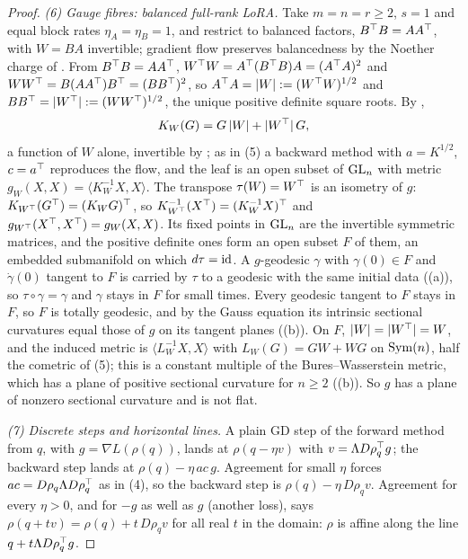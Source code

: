 \begin{proof}
\emph{(6) Gauge fibres: balanced full-rank LoRA.} Take $m=n=r\ge2$, $s=1$ and equal block rates $\eta_A=\eta_B=1$, and
restrict to balanced factors, $B^{\top} B=AA^{\top}$, with $W=BA$ invertible; gradient flow preserves balancedness by the Noether
charge of . From $B^{\top} B=AA^{\top}$, $W^{\top} W=A^{\top}(B^{\top} B)A=(A^{\top} A)^2$ and $WW^{\top}=B(AA^{\top})B^{\top}=(BB^{\top})^2$, so
$A^{\top} A=\lvert W\rvert:=(W^{\top} W)^{1/2}$ and $BB^{\top}=\lvert W^{\top}\rvert:=(WW^{\top})^{1/2}$, the unique positive definite square roots.
By ,
\[K_W(G)=G\,\lvert W\rvert+\lvert W^{\top}\rvert\,G ,\]
a function of $W$ alone, invertible by ; as in (5) a backward method with $a=K^{1/2}$, $c=a^{\top}$ reproduces the
flow, and the leaf is an open subset of $\mathrm{GL}_n$ with metric $g_W(X,X)=\langle K_W^{-1}X,X\rangle$. The transpose $\tau(W)=W^{\top}$
is an isometry of $g$: $K_{W^{\top}}(G^{\top})=(K_WG)^{\top}$, so $K_{W^{\top}}^{-1}(X^{\top})=(K_W^{-1}X)^{\top}$ and
$g_{W^{\top}}(X^{\top},X^{\top})=g_W(X,X)$. Its fixed points in $\mathrm{GL}_n$ are the invertible symmetric matrices, and the positive definite ones
form an open subset $F$ of them, an embedded submanifold on which $d\tau=\mathrm{id}$. A $g$-geodesic $\gamma$ with $\gamma(0)\in F$ and $\dot\gamma(0)$ tangent to $F$
is carried by $\tau$ to a geodesic with the same initial data ((a)), so $\tau\circ\gamma=\gamma$ and
$\gamma$ stays in $F$ for small times. Every geodesic tangent to $F$ stays in $F$, so $F$ is totally geodesic, and by the
Gauss equation its intrinsic sectional curvatures equal those of $g$ on its tangent planes ((b)). On $F$,
$\lvert W\rvert=\lvert W^{\top}\rvert=W$, and the induced metric is $\langle L_W^{-1}X,X\rangle$ with $L_W(G)=GW+WG$ on $\mathrm{Sym}(n)$,
half the cometric of (5); this is a constant multiple of the Bures--Wasserstein metric, which has a plane of positive
sectional curvature for $n\ge2$ ((b)). So $g$ has a plane of nonzero sectional curvature and is not flat.

\emph{(7) Discrete steps and horizontal lines.} A plain GD step of the forward method from $q$, with $g=\nabla L(\rho(q))$,
lands at $\rho(q-\eta v)$ with $v=\Lambda D\rho_q^{\top} g$; the backward step lands at $\rho(q)-\eta\,a c\,g$. Agreement for small
$\eta$ forces $ac=D\rho_q\Lambda D\rho_q^{\top}$ as in (4), so the backward step is $\rho(q)-\eta\,D\rho_qv$. Agreement for every
$\eta>0$, and for $-g$ as well as $g$ (another loss), says $\rho(q+tv)=\rho(q)+t\,D\rho_qv$ for all real $t$ in the domain:
$\rho$ is affine along the line $q+t\Lambda D\rho_q^{\top} g$.


\end{proof}
